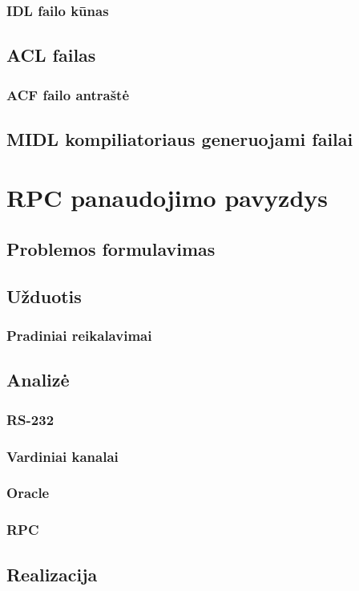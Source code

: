 \documentclass[12pt, a4paper, lithuanian]{article}
\begin{document}
\subsubsection{IDL failo kūnas}
\subsection{ACL failas}
\subsubsection{ACF failo antraštė}
\subsection{MIDL kompiliatoriaus generuojami failai}
\section{RPC panaudojimo pavyzdys}
\subsection{Problemos formulavimas}
\subsection{Užduotis}
\subsubsection{Pradiniai reikalavimai}
\subsection{Analizė}
\subsubsection{RS-232}
\subsubsection{Vardiniai kanalai}
\subsubsection{Oracle}
\subsubsection{RPC}
\subsection{Realizacija}
\end{document}
